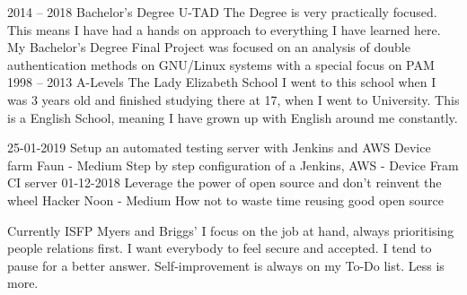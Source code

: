 \documentclass[9pt]{developercv} %
\begin{document}


\begin{entrylist}
	\entry
		{2014 -- 2018}
		{Bachelor's Degree}
		{U-TAD}
		{The Degree is very practically focused. This means I have had a hands on approach to everything I have learned here.
		My Bachelor's Degree Final Project was focused on an analysis of double authentication methods on GNU/Linux systems with a special focus on PAM}
	\entry
		{1998 -- 2013}
		{A-Levels}
		{The Lady Elizabeth School}
		{I went to this school when I was 3 years old and finished studying there at 17, when I went to University. This is a English School, meaning I have grown up with English around me constantly.}
\end{entrylist}


\begin{entrylist}
	\entry
		{25-01-2019}
		{Setup an automated testing server with Jenkins and AWS Device farm}
		{Faun - Medium}
		{Step by step configuration of a Jenkins, AWS - Device Fram CI server}
	\entry
		{01-12-2018}
		{Leverage the power of open source and don’t reinvent the wheel}
		{Hacker Noon - Medium}
    {How not to waste time reusing good open source}
\end{entrylist}


\begin{entrylist}
	\entry
		{Currently}
		{ISFP}
		{Myers and Briggs'}
		{I focus on the job at hand, always prioritising people relations first.
		I want everybody to feel secure and accepted.
		I tend to pause for a better answer.
		Self-improvement is always on my To-Do list.
		Less is more.}
\end{entrylist}

\end{document}
